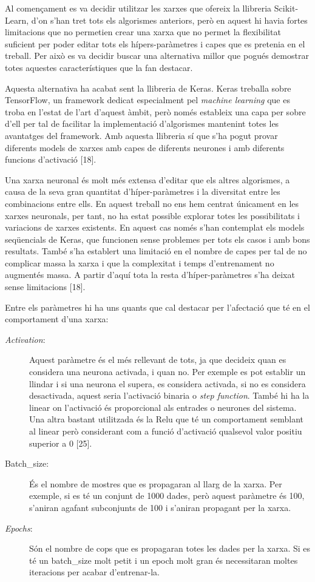 \documentclass[10pt,a4paper,twocolumn,twoside]{article}
\begin{document}
Al començament es va decidir utilitzar les xarxes que ofereix la llibreria Scikit-Learn, d'on s'han tret tots els algorismes anteriors, però en aquest hi havia fortes limitacions que no permetien crear una xarxa que no permet la flexibilitat suficient per poder editar tots els hípers-paràmetres i capes que es pretenia en el treball. Per això es va decidir buscar una alternativa millor que pogués demostrar totes aquestes característiques que la fan destacar.

Aquesta alternativa ha acabat sent la llibreria de Keras. Keras treballa sobre TensorFlow, un framework dedicat especialment pel \textit{machine learning} que es troba en l'estat de l'art d'aquest àmbit, però només estableix una capa per sobre d'ell per tal de facilitar la implementació d'algorismes mantenint totes les avantatges del framework. Amb aquesta llibreria sí que s'ha pogut provar diferents models de xarxes amb capes de diferents neurones i amb diferents funcions d'activació [18].

Una xarxa neuronal és molt més extensa d'editar que els altres algorismes, a causa de la seva gran quantitat d'híper-paràmetres i la diversitat entre les combinacions entre ells. En aquest treball no ens hem centrat únicament en les xarxes neuronals, per tant, no ha estat possible explorar totes les possibilitats i variacions de xarxes existents. En aquest cas només s'han contemplat els models seqüencials de Keras, que funcionen sense problemes per tots els casos i amb bons resultats. També s'ha establert una limitació en el nombre de capes per tal de no complicar massa la xarxa i que la complexitat i temps d'entrenament no augmentés massa. A partir d'aquí tota la resta d'híper-paràmetres s'ha deixat sense limitacions [18].

Entre els paràmetres hi ha uns quants que cal destacar per l'afectació que té en el comportament d'una xarxa:
\begin{description}
\item [\textit{Activation}:] Aquest paràmetre és el més rellevant de tots, ja que decideix quan es considera una neurona activada, i quan no. Per exemple es pot establir un llindar i si una neurona el supera, es considera activada, si no es considera desactivada, aquest seria l'activació binaria o \textit{step function}. També hi ha la linear on l'activació és proporcional als entrades o neurones del sistema. Una altra bastant utilitzada és la Relu que té un comportament semblant al linear però considerant com a funció d'activació qualsevol valor positiu superior a 0 [25].
\item[Batch\_size:] És el nombre de mostres que es propagaran al llarg de la xarxa. Per exemple, si es té un conjunt de 1000 dades, però aquest paràmetre és 100, s'aniran agafant subconjunts de 100 i s'aniran propagant per la xarxa.
\item[\textit{Epochs}:] Són el nombre de cops que es propagaran totes les dades per la xarxa. Si es té un batch\_size molt petit i un epoch molt gran és necessitaran moltes iteracions per acabar d'entrenar-la.
\end{description}
\end{document}
